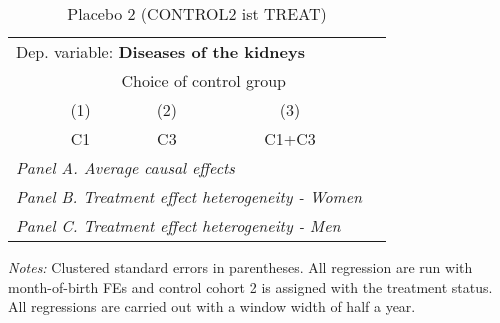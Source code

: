  \begin{table}[H] \centering \begin{threeparttable} \caption{Placebo 2 (CONTROL2 ist TREAT) } {\def\sym#1{\ifmmode^{#1}\else\(^{#1}\)\fi} \begin{tabular}{l*{4}{c}} \toprule \multicolumn{4}{l}{Dep. variable: \textbf{Diseases of the kidneys}} \\ & \multicolumn{3}{c}{Choice of control group} \\ \cmidrule(lr){2-4}
            &\multicolumn{1}{c}{(1)}&\multicolumn{1}{c}{(2)}&\multicolumn{1}{c}{(3)}\\
            &\multicolumn{1}{c}{C1}&\multicolumn{1}{c}{C3}&\multicolumn{1}{c}{C1+C3}\\
\midrule
 \multicolumn{4}{l}{\emph{Panel A. Average causal effects}} \\      \midrule\multicolumn{4}{l}{\emph{Panel B. Treatment effect heterogeneity - Women}} \\      \midrule\multicolumn{4}{l}{\emph{Panel C. Treatment effect heterogeneity - Men}} \\      
\bottomrule \end{tabular} } \begin{tablenotes} \item \scriptsize \emph{Notes:} Clustered standard errors in parentheses. All regression are run with month-of-birth FEs and control cohort 2 is assigned with the treatment status. All regressions are carried out with a window width of half a year. \end{tablenotes} \end{threeparttable} \end{table} 
